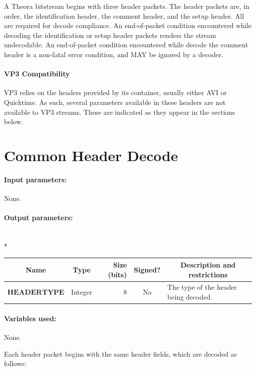 \documentclass[11pt,letterpaper]{book}
\newcommand{\bitvar}[1]{\ensuremath{\mathbf{\bm #1}}}
\numberwithin{equation}{chapter}
\numberwithin{figure}{chapter}
\numberwithin{table}{chapter}
\begin{document}
A Theora bitstream begins with three header packets.
The header packets are, in order, the identification header, the comment
 header, and the setup header.
All are required for decode compliance.
An end-of-packet condition encountered while decoding the identification or
 setup header packets renders the stream undecodable.
An end-of-packet condition encountered while decode the comment header is a
 non-fatal error condition, and MAY be ignored by a decoder.

\paragraph{VP3 Compatibility}

VP3 relies on the headers provided by its container, usually either AVI or
 Quicktime.
As such, several parameters available in these headers are not available to VP3
 streams.
These are indicated as they appear in the sections below.

\section{Common Header Decode}
\label{sub:common-header}

\paragraph{Input parameters:} None.

\paragraph{Output parameters:}\hfill\\*
\begin{tabularx}{\textwidth}{@{}llrcX@{}}\toprule
\multicolumn{1}{c}{Name} &
\multicolumn{1}{c}{Type} &
\multicolumn{1}{p{30pt}}{\centering Size (bits)} &
\multicolumn{1}{c}{Signed?} &
\multicolumn{1}{c}{Description and restrictions} \\\midrule\endhead
\bitvar{HEADERTYPE} & Integer & 8 & No & The type of the header being
 decoded. \\
\bottomrule\end{tabularx}

\paragraph{Variables used:} None.
\medskip

Each header packet begins with the same header fields, which are decoded as
 follows:
\end{document}
